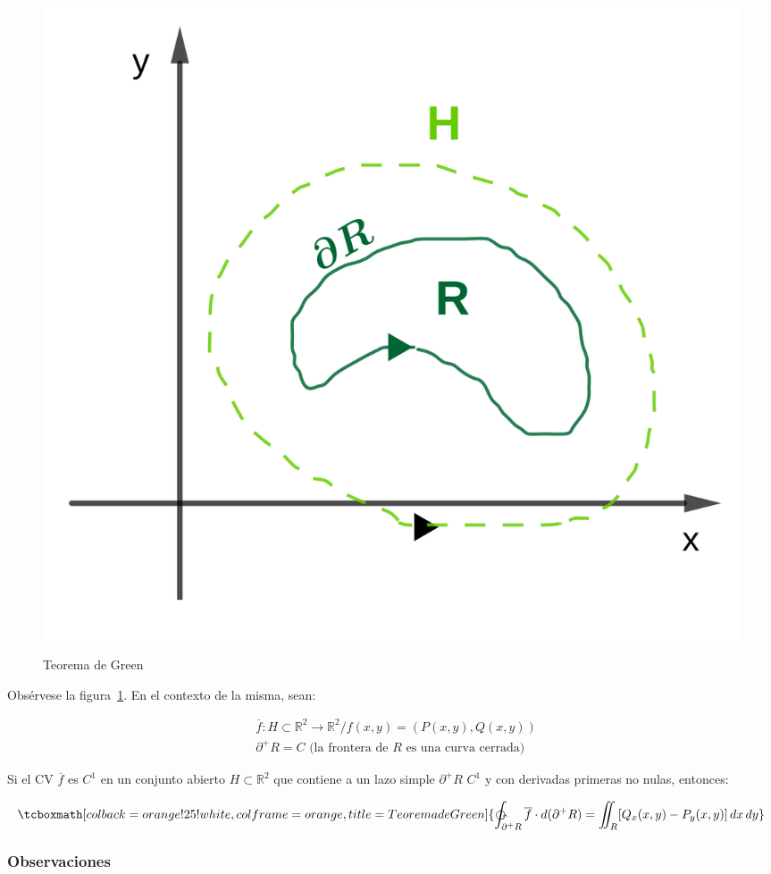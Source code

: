 \documentclass{article}
\renewcommand{\Bbb}{\mathbb}
\begin{document}
\begin{figure}[ht]
\centering
\caption{Teorema de Green}
\includegraphics[scale=0.85]{img/teoremas/green.png}
\label{fig:green}
\end{figure}

Obsérvese la figura~\ref{fig:green}. En el contexto de la misma, sean:

\begin{align}
& \overline{f}:H \subset \Bbb R^2 \rightarrow \Bbb R^2 / f(x,y) = (P(x,y), Q(x,y)) \\
& \partial^+ R = C \text{ (la frontera de } R \text{ es una curva cerrada)}
\end{align}

Si el CV $\overline{f}$ es $C^1$ en un conjunto abierto $H \subset \Bbb R^2$ que contiene a un lazo simple $\partial^+ R$ $C^1$ y con derivadas primeras no nulas, entonces:

\begin{equation}
\tcboxmath[colback=orange!25!white,colframe=orange, title=Teorema de Green]
{ \ointctrclockwise_{\partial^+ R} \overline{f} \cdot \mathop{d(\partial^+R)} = \iint_R [Q_x(x,y) - P_y(x,y)] \mathop{dx} \mathop{dy} }
\end{equation}

\subsubsection{Observaciones}
\end{document}
